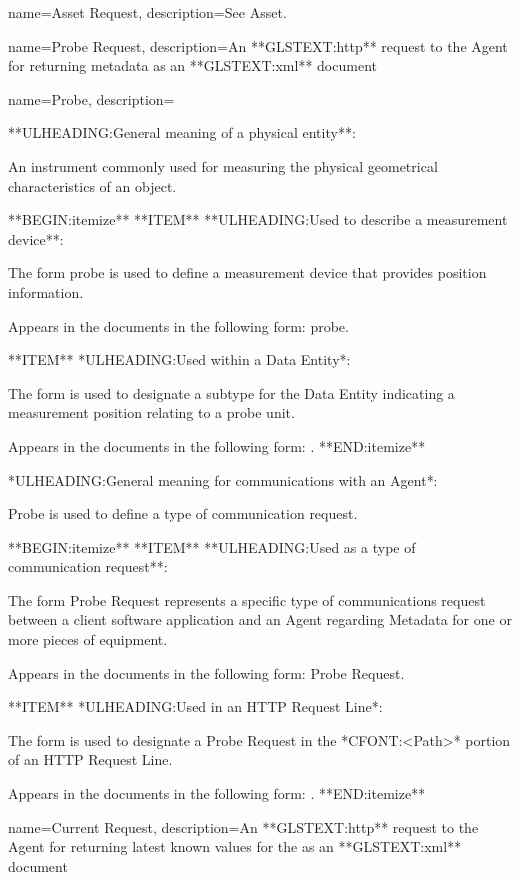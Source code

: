 {
    name={Asset Request},
	description={See \gls{Asset}.}
}

{
    name={Probe Request},
	description={An **GLSTEXT:http** request to the \gls{Agent} for returning metadata as an GLSTEXT:xml** document}
}

{
    name={Probe},
	description={
	**ULHEADING:General meaning of a physical entity**:

	An instrument commonly used for measuring the physical geometrical characteristics of an object.

    **BEGIN:itemize**
	**ITEM** **ULHEADING:Used to describe a measurement device**:

	The form probe is used to define a measurement device that provides position information.

	Appears in the documents in the following form: probe. 

	**ITEM** *ULHEADING:Used within a \gls{Data Entity}*:

	The form  is used to designate a subtype for the \gls{Data Entity}  indicating a measurement position relating to a probe unit.

	Appears in the documents in the following form: .
    **END:itemize**

	*ULHEADING:General meaning for communications with an \gls{Agent}*:

	Probe is used to define a type of communication request. 

    **BEGIN:itemize**
	**ITEM** **ULHEADING:Used as a type of communication request**:

	The form \gls{Probe Request} represents a specific type of communications request between a client software application and an \gls{Agent} regarding \gls{Metadata} for one or more pieces of equipment.

	Appears in the documents in the following form: \gls{Probe Request}.

	**ITEM** *ULHEADING:Used in an \gls{HTTP Request Line}*:

	The form  is used to designate a \gls{Probe Request} in the *CFONT:<Path>* portion of an \gls{HTTP Request Line}.

	Appears in the documents in the following form: .
    **END:itemize**
}
}

{
    name={Current Request},
	description={An **GLSTEXT:http** request to the \gls{Agent} for returning latest known values for the  as an GLSTEXT:xml** document}
}

